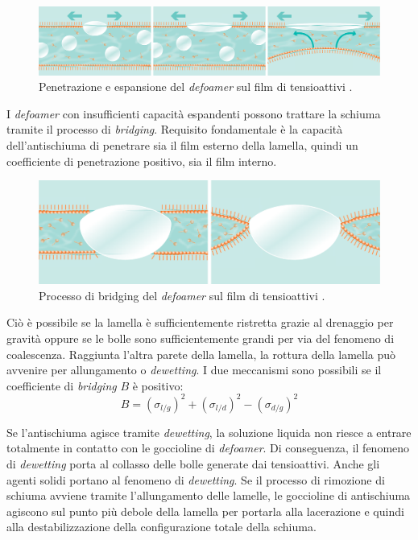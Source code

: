\begin{figure}[htbp]
    \centering
    \includegraphics[height=.11\textheight]{fig/foamer/penetration.png}
    \caption{Penetrazione e espansione del \textit{defoamer} sul film di tensioattivi \parencite{tego2014brochure}.}
    \label{fig:penetration}
\end{figure}

I \textit{defoamer} con insufficienti capacità espandenti possono trattare la schiuma tramite il processo di \textit{bridging}. Requisito fondamentale è la capacità dell'antischiuma di penetrare sia il film esterno della lamella, quindi un coefficiente di penetrazione positivo, sia il film interno. 

\begin{figure}[htbp]
    \centering
    \includegraphics[height=.11\textheight]{fig/foamer/bridging.png}
    \caption{Processo di bridging del \textit{defoamer} sul film di tensioattivi \parencite{tego2014brochure}.}
    \label{fig:bridging}
\end{figure}

Ciò è possibile se la lamella è sufficientemente ristretta grazie al drenaggio per gravità oppure se le bolle sono sufficientemente grandi per via del fenomeno di coalescenza. Raggiunta l'altra parete della lamella, la rottura della lamella può avvenire per allungamento o \textit{dewetting}. I due meccanismi sono possibili se il coefficiente di \textit{bridging} \(B\) è positivo:
\[B = (\sigma_{l/g})^2 + (\sigma_{l/d})^2 - (\sigma_{d/g})^2 \label{eq:bridging} \]

Se l'antischiuma agisce tramite \textit{dewetting}, la soluzione liquida non riesce a entrare totalmente in contatto con le goccioline di \textit{defoamer}. Di conseguenza, il fenomeno di \textit{dewetting} porta al collasso delle bolle generate dai tensioattivi. Anche gli agenti solidi portano al fenomeno di \textit{dewetting}.
Se il processo di rimozione di schiuma avviene tramite l'allungamento delle lamelle, le goccioline di antischiuma agiscono sul punto più debole della lamella per portarla alla lacerazione e quindi alla destabilizzazione della configurazione totale della schiuma.

